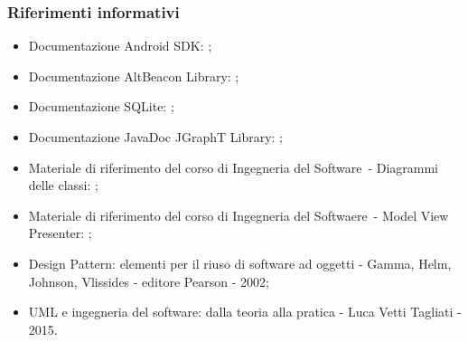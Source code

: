 \documentclass[../DefinizioneDiProdotto.tex]{subfiles}
\begin{document}
		\subsubsection{Riferimenti informativi}
		\begin{itemize}
			\item Documentazione Android SDK: ;
			\item Documentazione AltBeacon Library: ;
			\item Documentazione SQLite: ;
			\item Documentazione JavaDoc JGraphT Library: ;
			\item Materiale di riferimento del corso di Ingegneria del Software\g\ - Diagrammi delle classi: ;
			\item Materiale di riferimento del corso di Ingegneria del Softwaere\g\ - Model View Presenter: ;
			\item Design Pattern: elementi per il riuso di software ad oggetti - Gamma, Helm, Johnson, Vlissides - editore Pearson - 2002;
			\item UML e ingegneria del software: dalla teoria alla pratica - Luca Vetti Tagliati - 2015.
		\end{itemize}
		
\end{document}

